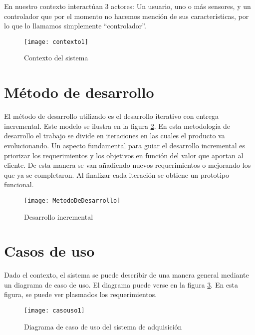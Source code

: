 En nuestro contexto interactúan 3 actores: Un usuario, uno o más sensores, y un controlador que por el momento no hacemos mención de sus características, por lo que lo llamamos simplemente ``controlador''.

\begin{figure}[h]
  \centering
  \texttt{[image: contexto1]}
  \caption{Contexto del sistema}\label{fig:contexto1}
\end{figure}


\section{Método de desarrollo} %
\label{sec:metodo_de_desarrollo}

El método de desarrollo utilizado es el desarrollo iterativo con entrega incremental. Este modelo se ilustra en la figura \ref{fig:MetodoDeDesarrollo}. En esta metodología de desarrollo el trabajo se divide en iteraciones en las cuales el producto va evolucionando. 
Un aspecto fundamental para guiar el desarrollo incremental es priorizar los requerimientos y los objetivos en función del valor que aportan al cliente. De esta manera se van añadiendo nuevos requerimientos o mejorando los que ya se completaron. Al finalizar cada iteración se obtiene un prototipo funcional.

\begin{figure}[h]
  \centering
  \texttt{[image: MetodoDeDesarrollo]}
  \caption{Desarrollo incremental}\label{fig:MetodoDeDesarrollo}
\end{figure}


\section{Casos de uso} %
\label{sec:casos_de_uso}

Dado el contexto, el sistema se puede describir de una manera general mediante un diagrama de caso de uso. El diagrama puede verse en la figura \ref{fig:casouso1}. En esta figura, se puede ver plasmados los requerimientos.

\begin{figure}[h]
  \centering
  \texttt{[image: casouso1]}
  \caption{Diagrama de caso de uso del sistema de adquisición}\label{fig:casouso1}
\end{figure}

